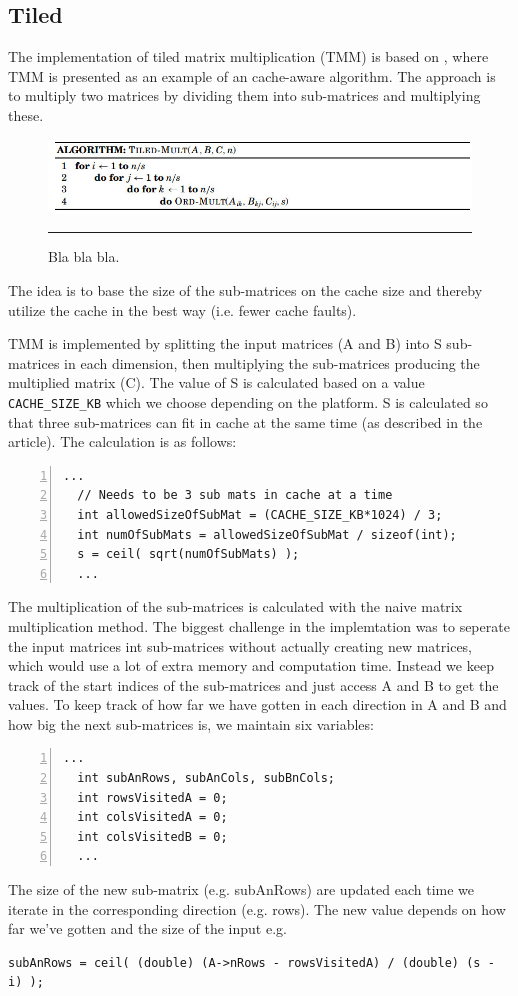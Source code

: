 \subsection{Tiled}
The implementation of tiled matrix multiplication (TMM) is based on \citep{matrixMultiplication}, where TMM is presented as an example of an cache-aware algorithm. 
The approach is to multiply two matrices by dividing them into sub-matrices and multiplying these. 
\begin{figure}[htbp]
	\centering
		\includegraphics[width=\textwidth]{./Figures/Project2a/TiledMulti_Pseudo.jpg}
		\rule{35em}{0.5pt}
	\caption[Branch misses]{
	Bla bla bla.
	}
	\label{fig:Branch_misses}
\end{figure}
The idea is to base the size of the sub-matrices on the cache size and thereby utilize the cache in the best way (i.e. fewer cache faults).   

TMM is implemented by splitting the input matrices (A and B) into S sub-matrices in each dimension, then multiplying the sub-matrices producing the multiplied matrix (C). 
The value of S is calculated based on a value \verb!CACHE_SIZE_KB! which we choose depending on the platform. S is calculated so that three sub-matrices can fit in cache at the same time (as described in the article).
The calculation is as follows:
\begin{lstlisting}[numbers=left]
  ...
  // Needs to be 3 sub mats in cache at a time
  int allowedSizeOfSubMat = (CACHE_SIZE_KB*1024) / 3;
  int numOfSubMats = allowedSizeOfSubMat / sizeof(int);
  s = ceil( sqrt(numOfSubMats) );
  ... 
\end{lstlisting}
The multiplication of the sub-matrices is calculated with the naive matrix multiplication method. 
The biggest challenge in the implemtation was to seperate the input matrices int sub-matrices without actually creating new matrices, which would use a lot of extra memory and computation time. 
Instead we keep track of the start indices of the sub-matrices and just access A and B to get the values. 
To keep track of how far we have gotten in each direction in A and B and how big the next sub-matrices is, we maintain six variables:
\begin{lstlisting}[numbers=left]
  ...
  int subAnRows, subAnCols, subBnCols;
  int rowsVisitedA = 0;
  int colsVisitedA = 0;
  int colsVisitedB = 0;
  ...
\end{lstlisting}
The size of the new sub-matrix (e.g. subAnRows) are updated each time we iterate in the corresponding direction (e.g. rows). 
The new value depends on how far we've gotten and the size of the input e.g.
\begin{lstlisting}
subAnRows = ceil( (double) (A->nRows - rowsVisitedA) / (double) (s - i) );
\end{lstlisting}

